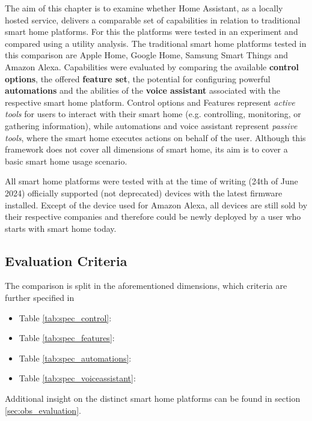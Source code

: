 The aim of this chapter is to examine whether Home Assistant, as a locally hosted service, delivers a comparable set of capabilities in relation to traditional smart home platforms. For this the platforms were tested in an experiment and compared using a utility analysis.
The traditional smart home platforms tested in this comparison are Apple Home, Google Home, Samsung Smart Things and Amazon Alexa. Capabilities were evaluated by comparing the available \textbf{control options}, the offered \textbf{feature set}, the potential for configuring powerful \textbf{automations} and the abilities of the \textbf{voice assistant }associated with the respective smart home platform.
Control options and Features represent \textit{active tools} for users to interact with their smart home (e.g. controlling, monitoring, or gathering information), while automations and voice assistant represent \textit{passive tools}, where the smart home executes actions on behalf of the user.
Although this framework does not cover all dimensions of smart home, its aim is to cover a basic smart home usage scenario.

All smart home platforms were tested with at the time of writing (24th of June 2024) officially supported (not deprecated) devices with the latest firmware installed. Except of the device used for Amazon Alexa, all devices are still sold by their respective companies and therefore could be newly deployed by a user who starts with smart home today.

\subsection{Evaluation Criteria}

The comparison is split in the aforementioned dimensions, which criteria are further specified in

\begin{itemize}
    \item Table \ref{tab:spec_control}: 
    \item Table \ref{tab:spec_features}: 
    \item Table \ref{tab:spec_automations}: 
    \item Table \ref{tab:spec_voiceassistant}: 
\end{itemize}

\noindent
Additional insight on the distinct smart home platforms can be found in section \ref{sec:obs_evaluation}.

